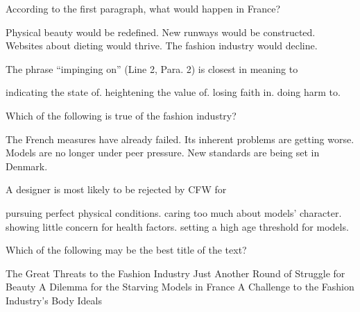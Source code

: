\item According to the first paragraph, what would happen in France?
\begin{tasks}
	\task Physical beauty would be redefined.
	\task New runways would be constructed.
	\task Websites about dieting would thrive.
	\task The fashion industry would decline.
\end{tasks}
\item The phrase ``impinging on'' (Line 2, Para. 2) is closest in meaning to
\begin{tasks}
	\task indicating the state of.
	\task heightening the value of.
	\task losing faith in.
	\task doing harm to.
\end{tasks}
\item Which of the following is true of the fashion industry?
\begin{tasks}
	\task The French measures have already failed.
	\task Its inherent problems are getting worse.
	\task Models are no longer under peer pressure.
	\task New standards are being set in Denmark.
\end{tasks}
\item A designer is most likely to be rejected by CFW for
\begin{tasks}
	\task pursuing perfect physical conditions.
	\task caring too much about models' character.
	\task showing little concern for health factors.
	\task setting a high age threshold for models.
\end{tasks}
\item Which of the following may be the best title of the text?
\begin{tasks}
	\task The Great Threats to the Fashion Industry
	\task Just Another Round of Struggle for Beauty
	\task A Dilemma for the Starving Models in France
	\task A Challenge to the Fashion Industry's Body Ideals
\end{tasks}